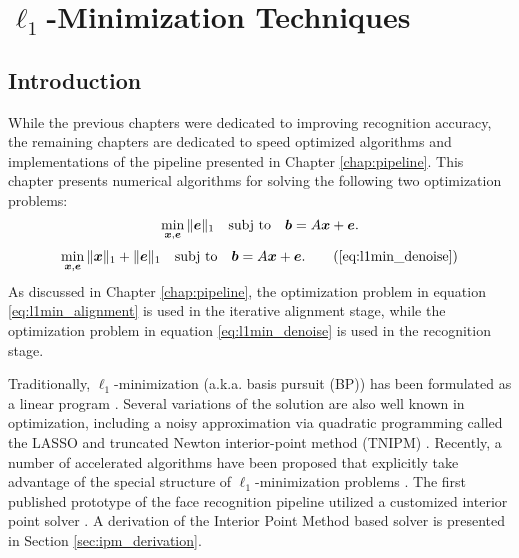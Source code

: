 \chapter{$\ell_1$-Minimization Techniques}
\label{chap:minimization}

\section{Introduction}
While the previous chapters were dedicated to improving recognition accuracy,
the remaining chapters are dedicated to speed optimized
algorithms and implementations of the pipeline presented in Chapter
\ref{chap:pipeline}.  This chapter presents numerical algorithms for solving the following
two optimization problems:
\begin{equation}
\min_{{\boldsymbol{x}}, {\boldsymbol{e}}} \|{\boldsymbol{e}}\|_1 \quad \textup{subj to} \quad \boldsymbol{b} = A {\boldsymbol{x}} + {\boldsymbol{e}}.
\label{eq:l1min_alignment}
\end{equation}
\begin{equation}
\min_{\xx, \ee} \| \xx \|_1 + \|\ee\|_1 \quad \subj \quad \bb = A \xx + \ee.
\tag{\ref{eq:l1min_denoise}}
\end{equation}
As discussed in Chapter \ref{chap:pipeline}, the optimization problem in equation
\ref{eq:l1min_alignment} is used in the iterative alignment stage, while the optimization
problem in equation \ref{eq:l1min_denoise} is used in the recognition stage.

Traditionally, $\ell_1$-minimization (a.k.a.
basis pursuit (BP)) has been formulated as a linear program
\cite{ChenS2001-SIAM}. 
Several variations of the solution are also well known
in optimization, including a noisy approximation via quadratic programming
called the LASSO \cite{TibshiraniR1996} and truncated Newton interior-point
method (TNIPM) \cite{KimS2007}.
Recently, a number of accelerated algorithms have been proposed that
explicitly take advantage of the special structure of $\ell_1$-minimization
problems \cite{LorisI2009,YangA2010-ICIP}. 
The first published prototype of the face recognition pipeline utilized a customized
interior point solver \cite{WagnerA2009-CVPR}.  A derivation of the Interior Point
Method based solver is presented in Section \ref{sec:ipm_derivation}.

